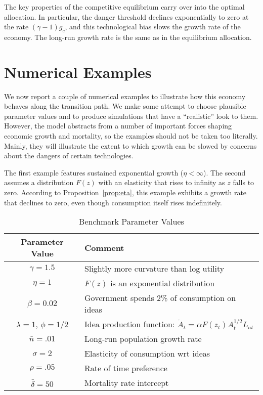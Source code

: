 \documentclass[12pt,twoside]{article}
\begin{document}
The key properties of the competitive equilibrium carry over into the
optimal allocation.  In particular, the danger threshold declines
exponentially to zero at the rate $(\gamma-1) g_c$, and this
technological bias slows the growth rate of the economy.  The long-run
growth rate is the same as in the equilibrium allocation.


\section{Numerical Examples}

We now report a couple of numerical examples to illustrate how this
economy behaves along the transition path. We make some attempt to
choose plausible parameter values and to produce simulations that have a
``realistic'' look to them. However, the model abstracts from a number
of important forces shaping economic growth and mortality, so the
examples should not be taken too literally. Mainly, they will illustrate
the extent to which growth can be slowed by concerns about the dangers
of certain technologies.

The first example features sustained exponential growth ($\eta<\infty$).
The second assumes a distribution $F(z)$ with an elasticity that rises
to infinity as $z$ falls to zero. According to
Proposition~\ref{prop:eta}, this example exhibits a growth rate that
declines to zero, even though consumption itself rises indefinitely.

\begin{table}[tp]
\caption{Benchmark Parameter Values}
\label{tab:params} %
\begin{tabular*}{\textwidth}{@{\extracolsep{\fill}}cl} \hline
 Parameter Value & Comment   \\ \hline
$\gamma=1.5$ & Slightly more curvature than log utility \\
$\eta=1$ & $F(z)$ is an exponential distribution  \\
$\beta=0.02$ & Government spends 2\% of consumption on ideas  \\
$\lambda=1$, $\phi=1/2$ & Idea production function: $\dot{A}_t = \alpha F(z_t) A_t ^{1/2} L_{at}$  \\
$\bar{n}=.01$ & Long-run population growth rate   \\
$\sigma=2$ & Elasticity of consumption wrt ideas  \\
$\rho=.05$ & Rate of time preference   \\
$\bar\delta=50$ & Mortality rate intercept   \\
\hline
\end{tabular*}
\end{table}
\end{document}
